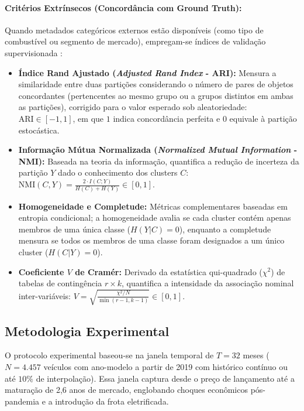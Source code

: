 \paragraph{Critérios Extrínsecos (Concordância com Ground Truth):}
Quando metadados categóricos externos estão disponíveis (como tipo de combustível ou segmento de mercado), empregam-se índices de validação supervisionada \cite{tan2019introduction}:
\begin{itemize}
    \item \textbf{Índice Rand Ajustado (\textit{Adjusted Rand Index} - ARI):} Mensura a similaridade entre duas partições considerando o número de pares de objetos concordantes (pertencentes ao mesmo grupo ou a grupos distintos em ambas as partições), corrigido para o valor esperado sob aleatoriedade: $\mathrm{ARI} \in [-1, 1]$, em que $1$ indica concordância perfeita e $0$ equivale à partição estocástica.
    \item \textbf{Informação Mútua Normalizada (\textit{Normalized Mutual Information} - NMI):} Baseada na teoria da informação, quantifica a redução de incerteza da partição $Y$ dado o conhecimento dos clusters $C$: $\mathrm{NMI}(C, Y) = \frac{2 \cdot I(C; Y)}{H(C) + H(Y)} \in [0, 1]$.
    \item \textbf{Homogeneidade e Completude:} Métricas complementares baseadas em entropia condicional; a homogeneidade avalia se cada cluster contém apenas membros de uma única classe ($H(Y|C) = 0$), enquanto a completude mensura se todos os membros de uma classe foram designados a um único cluster ($H(C|Y) = 0$).
    \item \textbf{Coeficiente $V$ de Cramér:} Derivado da estatística qui-quadrado ($\chi^2$) de tabelas de contingência $r \times k$, quantifica a intensidade da associação nominal inter-variáveis: $V = \sqrt{\frac{\chi^2 / N}{\min(r-1, k-1)}} \in [0, 1]$.
\end{itemize}

\subsection{Metodologia Experimental}

O protocolo experimental baseou-se na janela temporal de $T=32$ meses ($N = 4.457$ veículos com ano-modelo a partir de 2019 com histórico contínuo ou até $10\%$ de interpolação). Essa janela captura desde o preço de lançamento até a maturação de 2,6 anos de mercado, englobando choques econômicos pós-pandemia e a introdução da frota eletrificada.

